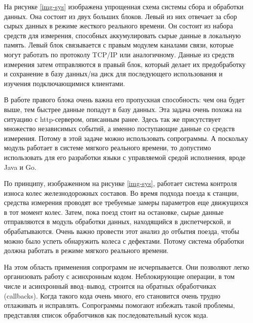 	На рисунке \ref{img-sys} изображена упрощенная схема системы сбора и обработки данных. Она состоит
	из двух больших блоков. Левый из них отвечает за сбор сырых данных в режиме жесткого реального времени.
	Он состоит из набора средств для измерения, способных аккумулировать сырые данные в локальную память.
	Левый блок связывается с правым модулем каналами связи, которые могут работать по протоколу TCP/IP или
	аналогичному.
	Данные из средств измерения затем отправляются в правый блок, который делает их предобработку и сохранение
	в базу данных/на диск для последующего использования и изучения подключающимися клиентами.
	\par
	В работе правого блока очень важна его пропускная способность: чем она будет выше, тем быстрее данные попадут
	в базу данных. Эта задача очень похожа на ситуацию с http-сервером, описанным ранее. Здесь так же
	присутствует множество независимых событий, а именно поступающие данные со средств измерения. 
	Потому в этой задаче можно использовать сопрограммы. А поскольку модуль работает в системе мягкого реального
	времени, то допустимо использовать для его разработки языки с управляемой средой исполнения, вроде Java и Go.
	\par
	По принципу, изображенном на рисунке \ref{img-sys}, работает система контроля износа колес
	железнодорожных составов. Во время подхода поезда к станции, средства измерения проводят все требуемые замеры
	параметров еще движущихся в тот момент колес. Затем, пока поезд стоит на остановке, сырые данные
	отправляются в модуль обработки данных, находящийся в диспетчерской, и обрабатываются. Очень важно провести
	этот анализ до отбытия поезда, чтобы можно было успеть обнаружить колеса с дефектами. Потому система
	обработки должна работать в режиме мягкого реального времени.
	\par
	На этом область применения сопрограмм не исчерпывается. Они позволяют легко организовать работу с 
	асинхронным  кодом.
	Неблокирующие операции, в том числе и асинхронный ввод--вывод, строится на обратных обработчиках (callbacks).
	Когда такого кода очень много, его становится очень трудно отлаживать и исправлять.
	Сопрограммы помогают избежать такой проблемы, представляя список обработчиков как
	последовательный кусок кода.
	
\clearpage